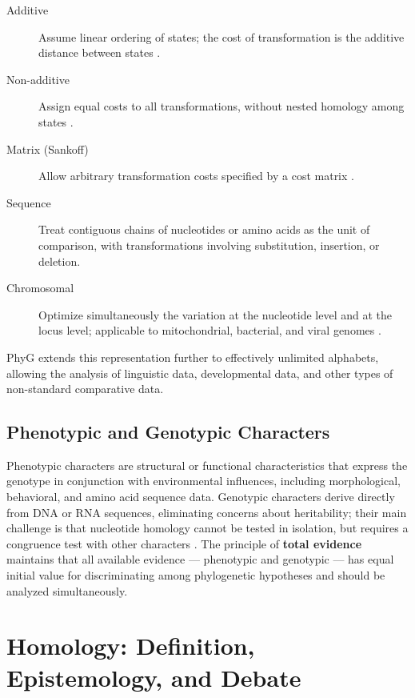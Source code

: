 \begin{description}
    \item[Additive] Assume linear ordering of states; the cost of transformation is the additive distance between states \parencite{farris1970}.

    \item[Non-additive] Assign equal costs to all transformations, without nested homology among states \parencite{fitch1971}.

    \item[Matrix (Sankoff)] Allow arbitrary transformation costs specified by a cost matrix \parencite{sankoff1975,sankoffrousseau1975}.

    \item[Sequence] Treat contiguous chains of nucleotides or amino acids as the unit of comparison, with transformations involving substitution, insertion, or deletion.

    \item[Chromosomal] Optimize simultaneously the variation at the nucleotide level and at the locus level; applicable to mitochondrial, bacterial, and viral genomes \parencite{wheeleretal2006}.
\end{description}

PhyG \parencite{wheeleretal2024} extends this representation further to effectively unlimited alphabets, allowing the analysis of linguistic data, developmental data, and other types of non-standard comparative data.

\subsection{Phenotypic and Genotypic Characters}

Phenotypic characters are structural or functional characteristics that express the genotype in conjunction with environmental influences, including morphological, behavioral, and amino acid sequence data. Genotypic characters derive directly from DNA or RNA sequences, eliminating concerns about heritability; their main challenge is that nucleotide homology cannot be tested in isolation, but requires a congruence test with other characters \parencite{wheeleretal2006}. The principle of \textbf{total evidence} \parencite{kluge1989} maintains that all available evidence --- phenotypic and genotypic --- has equal initial value for discriminating among phylogenetic hypotheses and should be analyzed simultaneously.

\section{Homology: Definition, Epistemology, and Debate}
\label{sec:homologia}

